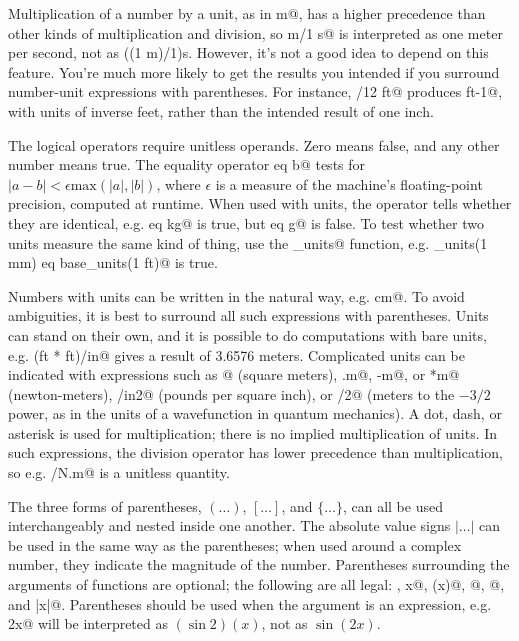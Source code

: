 \documentclass{doc}
\begin{document}
Multiplication of a number by a unit, as in  m@, has a higher precedence
than other kinds of multiplication and division, so  m/1 s@ is
interpreted as one meter per second, not as ((1 m)/1)s. However, it's
not a good idea to depend on this feature. You're much more likely to
get the results you intended if you surround number-unit expressions
with parentheses. For instance, /12 ft@ produces 
 ft-1@, with units of inverse feet, rather than
the intended result of one inch.

The logical operators require unitless operands. Zero means false, and
any other number means true. The equality operator \verb@a eq b@ tests
for $|a-b|<\epsilon \text{max}(|a|,|b|)$, where $\epsilon$ is a measure
of the machine's floating-point precision, computed at runtime. When used
with units, the \verb@eq@ operator tells whether they are identical, e.g.
\verb@kg eq kg@ is true, but \verb@kg eq g@ is false. To test whether two
units measure the same kind of thing, use the \verb@base_units@ function,
e.g. \verb@base_units(1 mm) eq base_units(1 ft)@ is true.

Numbers with units can be written in the natural way, e.g.  cm@. To avoid
ambiguities, it is best to surround all such expressions with parentheses.
Units can stand on their own, and it is possible to do computations with
bare units, e.g. \verb@(ft * ft)/in@ gives a result of 3.6576 meters.
Complicated units can be indicated with expressions such as
@ (square meters), \verb@N.m@, \verb@N-m@, or \verb@N*m@ (newton-meters), 
\verb@lb/in2@ (pounds per square inch), or
/2@ (meters to the $-3/2$ power, as in the units of a
wavefunction in quantum mechanics). A dot, dash, or asterisk is used for multiplication; there
is no implied multiplication of units.
In such expressions, the division
operator has lower precedence than multiplication, so e.g. \verb@J/N.m@ is
a unitless quantity.

The three forms of parentheses, $(\ldots)$, $[\ldots]$, and $\{\ldots\}$, can all be used
interchangeably and nested inside one another. The absolute value
signs $|\ldots|$ can be used in the same way as the parentheses; when
used around a complex number, they indicate the magnitude of the number.
Parentheses surrounding the arguments of functions are optional; the following
are all legal: \verb@sinx@, \verb@sin x@, \verb@sin(x)@, \verb@sin[x]@, @, and
\verb@sin|x|@. Parentheses should be used when the argument is an expression, e.g.
\verb@sin 2x@ will be interpreted as $(\sin 2)(x)$, not as $\sin(2x)$.
\end{document}
